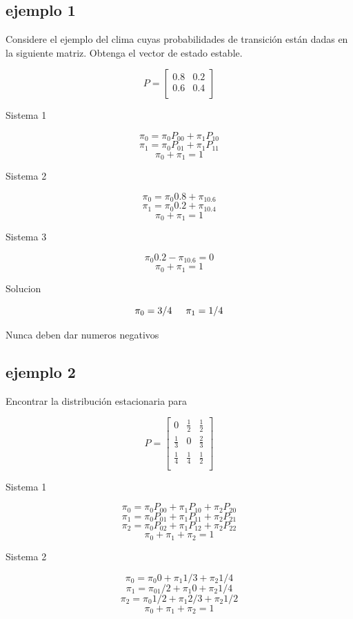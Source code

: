 \documentclass{article}
\begin{document}
\subsection*{ejemplo 1}

Considere el ejemplo del clima cuyas probabilidades de transición están dadas en la siguiente matriz. Obtenga el vector de estado estable.

\[
    P =
    \begin{bmatrix}
        0.8 & 0.2 \\
        0.6 & 0.4 \\
    \end{bmatrix}
\]

Sistema 1

\[\pi_0 = \pi_0P_{00} + \pi_1P_{10}\]
\[\pi_1 = \pi_0P_{01} + \pi_1P_{11}\]
\[\pi_0 + \pi_1 = 1\]

Sistema 2

\[\pi_0 = \pi_0 0.8 + \pi_10.6\]
\[\pi_1 = \pi_0 0.2 + \pi_10.4\]
\[\pi_0 + \pi_1 = 1\]

Sistema 3

\[\pi_0 0.2 - \pi_10.6 = 0\]
\[\pi_0 + \pi_1 = 1\]

Solucion

\[\pi_0 = 3/4 \hspace{.5cm} \pi_1 = 1/4\]

Nunca deben dar numeros negativos
\subsection*{ejemplo 2}

Encontrar la distribución estacionaria para

\[
    P =
    \begin{bmatrix}
        0           & \frac{1}{2} & \frac{1}{2} \\
        \frac{1}{3} & 0           & \frac{2}{3} \\
        \frac{1}{4} & \frac{1}{4} & \frac{1}{2} \\
    \end{bmatrix}
\]

Sistema 1

\[\pi_0 = \pi_0P_{00} + \pi_1P_{10} + \pi_2P_{20}\]
\[\pi_1 = \pi_0P_{01} + \pi_1P_{11} + \pi_2P_{21}\]
\[\pi_2 = \pi_0P_{02} + \pi_1P_{12} + \pi_2P_{22}\]
\[\pi_0 + \pi_1 + \pi_2 = 1\]

Sistema 2

\[\pi_0 = \pi_0 0 + \pi_1 1/3 + \pi_2 1/4\]
\[\pi_1 = \pi_01/2 + \pi_1 0 + \pi_2 1/4\]
\[\pi_2 = \pi_0 1/2 + \pi_1 2/3 + \pi_2 1/2\]
\[\pi_0 + \pi_1 + \pi_2 = 1\]
\end{document}
